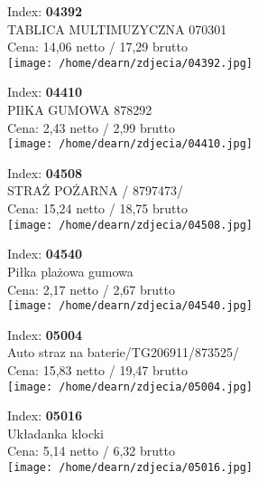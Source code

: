{Index: \textbf{04392}\\
TABLICA MULTIMUZYCZNA  070301\\
Cena: 14,06 netto / 17,29 brutto\\
  \texttt{[image: /home/dearn/zdjecia/04392.jpg]}}\newline\newline

{Index: \textbf{04410}\\
PIłKA GUMOWA                                   878292\\
Cena: 2,43 netto / 2,99 brutto\\
  \texttt{[image: /home/dearn/zdjecia/04410.jpg]}}\newline\newline

{Index: \textbf{04508}\\
STRAŻ POŻARNA  / 8797473/\\
Cena: 15,24 netto / 18,75 brutto\\
  \texttt{[image: /home/dearn/zdjecia/04508.jpg]}}\newline\newline

{Index: \textbf{04540}\\
Piłka plażowa gumowa\\
Cena: 2,17 netto / 2,67 brutto\\
  \texttt{[image: /home/dearn/zdjecia/04540.jpg]}}\newline\newline

{Index: \textbf{05004}\\
Auto straz na baterie/TG206911/873525/\\
Cena: 15,83 netto / 19,47 brutto\\
  \texttt{[image: /home/dearn/zdjecia/05004.jpg]}}\newline\newline

{Index: \textbf{05016}\\
Układanka klocki\\
Cena: 5,14 netto / 6,32 brutto\\
  \texttt{[image: /home/dearn/zdjecia/05016.jpg]}}\newline\newline

